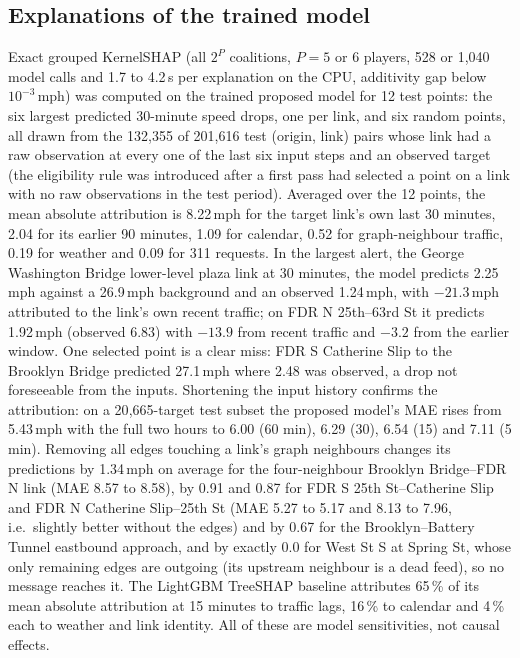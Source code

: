 \subsection{Explanations of the trained model}
Exact grouped KernelSHAP (all $2^P$ coalitions, $P=5$ or 6 players, 528 or 1{,}040 model calls and 1.7 to 4.2\,s per
explanation on the CPU, additivity gap below $10^{-3}$\,mph) was computed on the trained proposed model for 12 test
points: the six largest predicted 30-minute speed drops, one per link, and six random points, all drawn from the
132{,}355 of 201{,}616 test (origin, link) pairs whose link had a raw observation at every one of the last six input
steps and an observed target (the eligibility rule was introduced after a first pass had selected a point on a link with no raw
observations in the test period). Averaged over the 12 points, the mean absolute attribution is 8.22\,mph for the target
link's own last 30 minutes, 2.04 for its earlier 90 minutes, 1.09 for calendar, 0.52 for graph-neighbour traffic,
0.19 for weather and 0.09 for 311 requests. In the largest alert, the George Washington Bridge lower-level plaza
link at 30 minutes, the model predicts 2.25\,mph against a 26.9\,mph background and an observed 1.24\,mph, with
$-21.3$\,mph attributed to the link's own recent traffic; on FDR N 25th--63rd St it predicts 1.92\,mph (observed 6.83)
with $-13.9$ from recent traffic and $-3.2$ from the earlier window. One selected point is a clear miss: FDR S
Catherine Slip to the Brooklyn Bridge predicted 27.1\,mph where 2.48 was observed, a drop not foreseeable from the
inputs. Shortening the input history confirms the attribution: on a 20{,}665-target test subset the proposed model's
MAE rises from 5.43\,mph with the full two hours to 6.00 (60 min), 6.29 (30), 6.54 (15) and 7.11 (5 min). Removing
all edges touching a link's graph neighbours changes its predictions by 1.34\,mph on average for the four-neighbour
Brooklyn Bridge--FDR N link (MAE 8.57 to 8.58), by 0.91 and 0.87 for FDR S 25th St--Catherine Slip and FDR N
Catherine Slip--25th St (MAE 5.27 to 5.17 and 8.13 to 7.96, i.e.\ slightly better without the edges) and by 0.67 for
the Brooklyn--Battery Tunnel eastbound approach, and by exactly 0.0 for West St S at Spring St, whose only remaining
edges are outgoing (its upstream neighbour is a dead feed), so no message reaches it. The LightGBM TreeSHAP baseline
attributes 65\,\% of its mean absolute attribution at 15 minutes to traffic lags, 16\,\% to calendar and 4\,\% each
to weather and link identity. All of these are model sensitivities, not causal effects.

